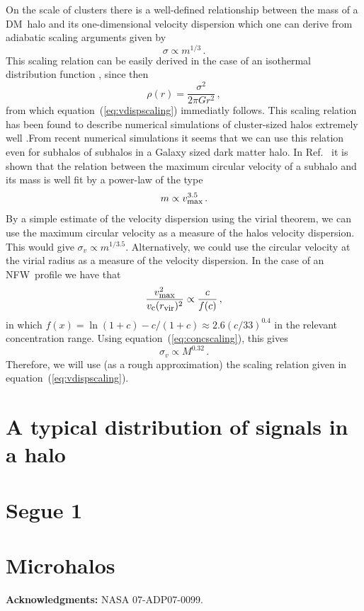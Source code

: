 \documentclass[aps,prd,twocolumn,amsmath,amssymb,floatfix,nofootinbib,10pt]{revtex4}
\newcommand{\NFW}{NFW}
\newcommand{\DM}{DM}
\newcommand{\eqnname}{equation}
\newcommand{\sigv}{\ensuremath{\sigma_v}}
\newcommand{\Rvir}{\ensuremath{r_{\mbox{{\footnotesize vir}}}}}
\newcommand{\vcirc}{\ensuremath{v_{\mbox{{\footnotesize c}}}}}
\newcommand{\vmax}{\ensuremath{v_{\mbox{{\footnotesize max}}}}}
\begin{document}
On the scale of clusters there is a well-defined relationship between
the mass of a \DM\ halo and its one-dimensional velocity dispersion
which one can derive from adiabatic scaling arguments
\cite{1998ApJ...495...80B} given by
\begin{equation}\label{eq:vdispscaling}
\sigma \propto m^{1/3}\, .
\end{equation}
This scaling relation can be easily derived in the case of an
isothermal distribution function \cite{2008gady.book.....B}, since
then
\begin{equation}
\rho(r) = \frac{\sigma^2}{2\pi G r^2}\, ,
\end{equation}
from which \eqnname\ (\ref{eq:vdispscaling}) immediatly follows. This
scaling relation has been found to describe numerical simulations of
cluster-sized halos extremely well
\cite{1991ApJ...383...95E,1995MNRAS.275..720N,1995AJ....110...21C,1996ApJ...469..494E,1996MNRAS.281..716C,1998ApJ...495...80B}.From
recent numerical simulations it seems that we can use this relation
even for subhalos of subhalos in a Galaxy sized dark matter halo. In
Ref.~\cite{2008MNRAS.391.1685S} it is shown that the relation between
the maximum circular velocity of a subhalo and its mass is well fit by
a power-law of the type
\begin{equation}
m \propto \vmax^{3.5}\, .
\end{equation}
By a simple estimate of the velocity dispersion using the virial
theorem, we can use the maximum circular velocity as a measure of the
halos velocity dispersion. This would give $\sigv \propto
m^{1/3.5}$. Alternatively, we could use the circular velocity at the
virial radius as a measure of the velocity dispersion. In the case of
an \NFW\ profile we have that
\begin{equation}
\frac{\vmax^2}{\vcirc(\Rvir)^2} \propto \frac{c}{f(c)}\, ,
\end{equation}
in which $f(x) = \ln(1+c) - c/(1+c) \approx 2.6 (c/33)^{0.4}$ in the
relevant concentration range. Using \eqnname\ (\ref{eq:concscaling}),
this gives
\begin{equation}
\sigv \propto M^{0.32}\, .
\end{equation}
Therefore, we will use (as a rough approximation) the scaling relation
given in \eqnname\ (\ref{eq:vdispscaling}).


\section{A typical distribution of signals in a halo}


\section{Segue 1}


\section{Microhalos}


{\bf Acknowledgments:}
NASA 07-ADP07-0099.





\end{document}
